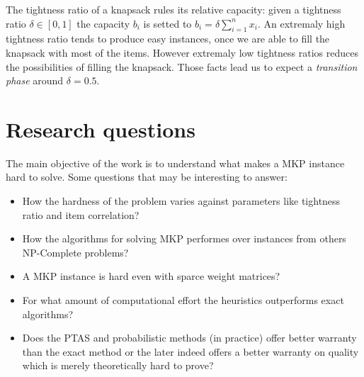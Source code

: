 \documentclass{article}
\begin{document}
The tightness ratio of a knapsack rules its relative capacity:
given a tightness ratio $\delta \in [0,1]$ the capacity $b_i$ is setted to
$b_i = \delta \sum_{i=1}^n x_i$. 
An extremaly high tightness ratio tends to produce easy instances, once we
are able to fill the knapsack with most of the items.
However extremaly low tightness ratios reduces the possibilities of filling the
knapsack.
Those facts lead us to expect a {\it transition phase} around $ \delta = 0.5$.


\section{Research questions}
\label{questions}

The main objective of the work is to understand what makes a MKP instance hard
to solve.
Some questions that may be interesting to answer:
\begin{itemize}
  \item{How the hardness of the problem varies against parameters like
    tightness ratio and item correlation?}
  \item{How the algorithms for solving MKP performes over instances from
    others NP-Complete problems?}
  \item{A MKP instance is hard even with sparce weight matrices?}
  \item{For what amount of computational effort the heuristics outperforms
    exact algorithms?}
  \item{Does the PTAS and probabilistic methods (in practice) offer
    better warranty than the exact method or the later indeed offers a better
	warranty on quality which is merely theoretically hard to prove?}
\end{itemize}



\end{document}
